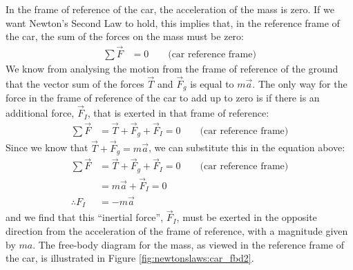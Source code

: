 In the frame of reference of the car, the acceleration of the mass is zero. If we want Newton's Second Law to hold, this implies that, in the reference frame of the car, the sum of the forces on the mass must be zero:
\begin{align*}
\sum \vec F & = 0\quad\quad\text{(car reference frame)}
\end{align*}
We know from analysing the motion from the frame of reference of the ground that the vector sum of the forces $\vec T$ and $\vec F_g$ is equal to $m\vec a$. The only way for the force in the frame of reference of the car to add up to zero is if there is an additional force, $\vec F_I$, that is exerted in that frame of reference:
\begin{align*}
\sum \vec F &= \vec T + \vec F_g + \vec F_I =0\quad\quad\text{(car reference frame)}
\end{align*}
Since we know that $\vec T + \vec F_g=m\vec a$, we can substitute this in the equation above:
\begin{align*}
\sum \vec F &= \vec T + \vec F_g + \vec F_I =0\quad\quad\text{(car reference frame)}\\
&=m\vec a+\vec F_I = 0\\
\therefore F_I &= -m\vec a
\end{align*}
and we find that this ``inertial force'', $\vec F_I$, must be exerted in the opposite direction from the acceleration of the frame of reference, with a magnitude given by $ma$. The free-body diagram for the mass, as viewed in the reference frame of the car, is illustrated in Figure \ref{fig:newtonslaws:car_fbd2}. 

